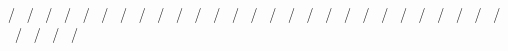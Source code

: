 /                                                                                   \
/                                                                                 \
/                                                                                   \
/                                                                                 \
/                                                                                   \
/                                                                                 \
/                                                                                   \
/                                                                                 \
/                                                                                   \
/                                                                                 \
/                                                                                   \
/                                                                                 \
/                                                                                   \
/                                                                                 \
/                                                                                   \
/                                                                                 \
/                                                                                   \
/                                                                                 \
/                                                                                   \
/                                                                                 \
/                                                                                   \
/                                                                                 \
/                                                                                   \
/                                                                                 \
/                                                                                   \
/                                                                                 \
/                                                                                   \
/                                                                                 \
/                                                                                   \
/                                                                                 \
/                                                                                   \
